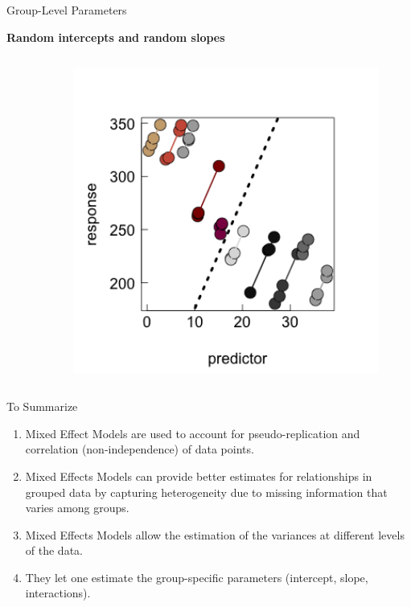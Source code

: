 \documentclass{beamer}
\begin{document}
\begin{frame}{Group-Level Parameters}

\textbf{Random intercepts and random slopes}

\begin{columns}[onlytextwidth] 
  \begin{column}{0.5\textwidth}
      \scalebox{0.85}{
      
      }    
      \end{column}
    \hspace{0.02\textwidth} %
    \begin{column}{0.5\textwidth}
      \begin{center}
        \includegraphics[width=0.9\textwidth]{lectures/day_1_intro_to_mems/figures/unnamed-chunk-14-1.png}
      \end{center}
    \end{column}
  \end{columns}
  

\end{frame}


\begin{frame}{To Summarize}

  \begin{enumerate}
      \item Mixed Effect Models are used to account for pseudo-replication and correlation (non-independence) of data points.
      \item Mixed Effects Models can provide better estimates for relationships in grouped data by capturing heterogeneity due to missing information that varies among groups.
      \item Mixed Effects Models allow the estimation of the variances at different levels of the data.
          \item They let one estimate the group-specific parameters (intercept, slope, interactions).
    \end{enumerate}
    
 \end{frame}
\end{document}
